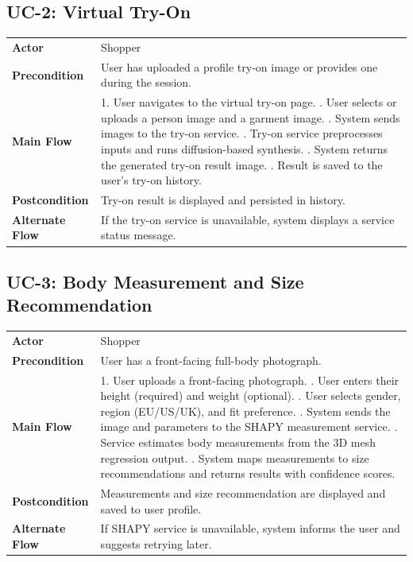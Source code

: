 \subsection{UC-2: Virtual Try-On}
\begin{tabular}{p{3.5cm} p{10cm}}
\toprule
\textbf{Actor} & Shopper \\
\textbf{Precondition} & User has uploaded a profile try-on image or provides one during the session. \\
\textbf{Main Flow} &
1. User navigates to the virtual try-on page. \newline
2. User selects or uploads a person image and a garment image. \newline
3. System sends images to the try-on service. \newline
4. Try-on service preprocesses inputs and runs diffusion-based synthesis. \newline
5. System returns the generated try-on result image. \newline
6. Result is saved to the user's try-on history. \\
\textbf{Postcondition} & Try-on result is displayed and persisted in history. \\
\textbf{Alternate Flow} & If the try-on service is unavailable, system displays a service status message. \\
\bottomrule
\end{tabular}

\vspace{1em}

\subsection{UC-3: Body Measurement and Size Recommendation}
\begin{tabular}{p{3.5cm} p{10cm}}
\toprule
\textbf{Actor} & Shopper \\
\textbf{Precondition} & User has a front-facing full-body photograph. \\
\textbf{Main Flow} &
1. User uploads a front-facing photograph. \newline
2. User enters their height (required) and weight (optional). \newline
3. User selects gender, region (EU/US/UK), and fit preference. \newline
4. System sends the image and parameters to the SHAPY measurement service. \newline
5. Service estimates body measurements from the 3D mesh regression output. \newline
6. System maps measurements to size recommendations and returns results with confidence scores. \\
\textbf{Postcondition} & Measurements and size recommendation are displayed and saved to user profile. \\
\textbf{Alternate Flow} & If SHAPY service is unavailable, system informs the user and suggests retrying later. \\
\bottomrule
\end{tabular}

